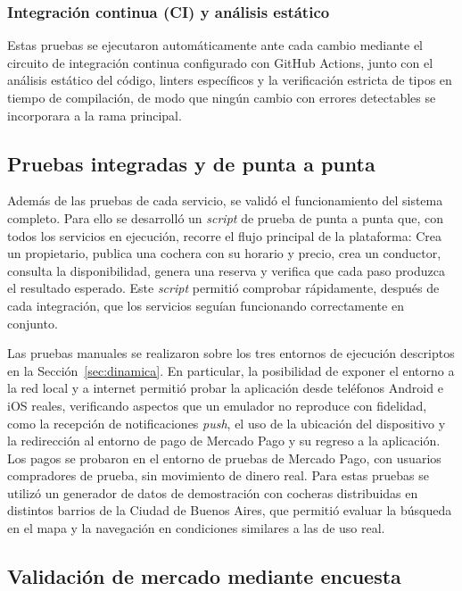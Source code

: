 \subsubsection{Integración continua (CI) y análisis estático}

Estas pruebas se ejecutaron automáticamente ante cada cambio mediante el circuito de integración continua configurado con GitHub Actions, junto con el análisis estático del código, linters específicos y la verificación estricta de tipos en tiempo de compilación, de modo que ningún cambio con errores detectables se incorporara a la rama principal.

\subsection{Pruebas integradas y de punta a punta}

Además de las pruebas de cada servicio, se validó el funcionamiento del sistema completo. Para ello se desarrolló un \textit{script} de prueba de punta a punta que, con todos los servicios en ejecución, recorre el flujo principal de la plataforma: Crea un propietario, publica una cochera con su horario y precio, crea un conductor, consulta la disponibilidad, genera una reserva y verifica que cada paso produzca el resultado esperado. Este \textit{script} permitió comprobar rápidamente, después de cada integración, que los servicios seguían funcionando correctamente en conjunto.

Las pruebas manuales se realizaron sobre los tres entornos de ejecución descriptos en la Sección~\ref{sec:dinamica}. En particular, la posibilidad de exponer el entorno a la red local y a internet permitió probar la aplicación desde teléfonos Android e iOS reales, verificando aspectos que un emulador no reproduce con fidelidad, como la recepción de notificaciones \textit{push}, el uso de la ubicación del dispositivo y la redirección al entorno de pago de Mercado Pago y su regreso a la aplicación. Los pagos se probaron en el entorno de pruebas de Mercado Pago, con usuarios compradores de prueba, sin movimiento de dinero real. Para estas pruebas se utilizó un generador de datos de demostración con cocheras distribuidas en distintos barrios de la Ciudad de Buenos Aires, que permitió evaluar la búsqueda en el mapa y la navegación en condiciones similares a las de uso real.

\subsection{Validación de mercado mediante encuesta}\label{sec:encuesta}

